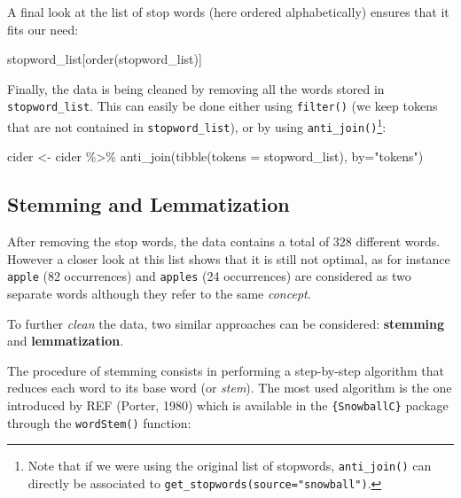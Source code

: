 \documentclass[
]{krantz}
\makeatletter
\newenvironment{Shaded}{\begin{snugshade}}{\end{snugshade}}
\newcommand{\AttributeTok}[1]{\textcolor[rgb]{0.61,0.61,0.61}{#1}}
\newcommand{\FunctionTok}[1]{\textcolor[rgb]{0,0,0}{#1}}
\newcommand{\NormalTok}[1]{#1}
\newcommand{\OtherTok}[1]{\textcolor[rgb]{0.37,0.37,0.37}{#1}}
\newcommand{\SpecialCharTok}[1]{\textcolor[rgb]{0,0,0}{#1}}
\newcommand{\StringTok}[1]{\textcolor[rgb]{0.5,0.5,0.5}{#1}}
\newenvironment{kframe}{%
\medskip{}
\setlength{\fboxsep}{.8em}
 \def\at@end@of@kframe{}%
 \ifinner\ifhmode%
  \def\at@end@of@kframe{\end{minipage}}%
  \begin{minipage}{\columnwidth}%
 \fi\fi%
 \def\FrameCommand##1{\hskip\@totalleftmargin \hskip-\fboxsep
 \colorbox{shadecolor}{##1}\hskip-\fboxsep
     \hskip-\linewidth \hskip-\@totalleftmargin \hskip\columnwidth}%
 \MakeFramed {\advance\hsize-\width
   \@totalleftmargin\z@ \linewidth\hsize
   \@setminipage}}%
 {\par\unskip\endMakeFramed%
 \at@end@of@kframe}
\renewenvironment{Shaded}{\begin{kframe}}{\end{kframe}}
\makeatother
\begin{document}
A final look at the list of stop words (here ordered alphabetically) ensures that it fits our need:

\begin{Shaded}
\begin{Highlighting}[]
\NormalTok{stopword\_list[}\FunctionTok{order}\NormalTok{(stopword\_list)]}
\end{Highlighting}
\end{Shaded}

Finally, the data is being cleaned by removing all the words stored in \texttt{stopword\_list}. This can easily be done either using \texttt{filter()} (we keep tokens that are not contained in \texttt{stopword\_list}), or by using \texttt{anti\_join()}\footnote{Note that if we were using the original list of stopwords, \texttt{anti\_join()} can directly be associated to \texttt{get\_stopwords(source="snowball")}.}:

\begin{Shaded}
\begin{Highlighting}[]
\NormalTok{cider }\OtherTok{\textless{}{-}}\NormalTok{ cider }\SpecialCharTok{\%\textgreater{}\%} 
  \FunctionTok{anti\_join}\NormalTok{(}\FunctionTok{tibble}\NormalTok{(}\AttributeTok{tokens =}\NormalTok{ stopword\_list), }\AttributeTok{by=}\StringTok{"tokens"}\NormalTok{)}
\end{Highlighting}
\end{Shaded}

\hypertarget{stemming-and-lemmatization}{%
\subsection{Stemming and Lemmatization}\label{stemming-and-lemmatization}}

After removing the stop words, the data contains a total of 328 different words. However a closer look at this list shows that it is still not optimal, as for instance \texttt{apple} (82 occurrences) and \texttt{apples} (24 occurrences) are considered as two separate words although they refer to the same \emph{concept}.

To further \emph{clean} the data, two similar approaches can be considered: \textbf{stemming} and \textbf{lemmatization}.

The procedure of stemming consists in performing a step-by-step algorithm that reduces each word to its base word (or \emph{stem}). The most used algorithm is the one introduced by REF (Porter, 1980) which is available in the \texttt{\{SnowballC\}} package through the \texttt{wordStem()} function:
\end{document}
